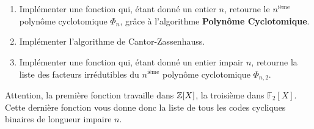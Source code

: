 \\
\\

\begin{enumerate}
\item Implémenter une fonction qui, étant donné un entier $n$, retourne le $n^{\text{ième}}$ polynôme cyclotomique $\Phi_n$, grâce à l'algorithme \textbf{Polynôme Cyclotomique}.
\item Implémenter l'algorithme de Cantor-Zassenhauss.
\item Implémenter une fonction qui, étant donné un entier impair $n$, retourne la liste des facteurs irrédutibles du $n^{\text{ième}}$ polynôme cyclotomique $\Phi_{n,2}$.
\end{enumerate}

Attention, la première fonction travaille dans $\mathbb Z[X]$, la troisième dans $\mathbb F_2[X]$. Cette dernière fonction vous donne donc la liste de tous les codes cycliques binaires de longueur impaire $n$.

